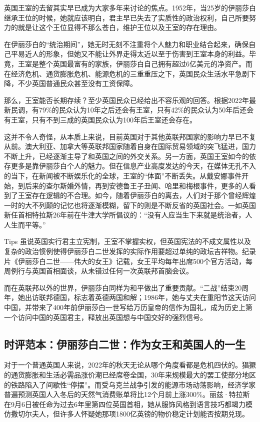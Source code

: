 英国王室的去留其实早已成为大家多年来讨论的焦点。1952年，当25岁的伊丽莎白继承王位的时候，她就应该明白，君主早已失去了实质性的政治权利，自己所要努力的就是让这个王位显得不那么苍白，维护王位以及王室的存在理由。

在伊丽莎白的“统治期间”，她无时无刻不注重将个人魅力和职业结合起来，确保自己平易近人的形象，但她又不能让外界走得太近以至于伤害到王室本身的利益。毕竟，王室是整个英国最富有的家族，伊丽莎白自己拥有超过6亿美元的净资产。而在经济危机、通货膨胀危机、能源危机的三重重压之下，英国民众生活水平急剧下降，不少英国普通民众甚至没有工资保障。

那么，王室能否长期存续？至少英国民众已经给出不容乐观的回答。根据2022年最新民调，有79\%的民众认为10年之后还会有王室，只有42\%的民众认为50年后还会有王室，只有不到三成的英国民众认为100年后王室还会存在。

这并不令人奇怪，从本质上来说，目前英国对于其他英联邦国家的影响力早已不复从前。澳大利亚、加拿大等英联邦国家随着自身在国际贸易领域的突飞猛进，国力不断上升，已经逐渐主导了和英国之间的外交关系。另一方面，英国王室如今的依存更多是靠伊丽莎白个人的魅力。但在信息产业高度发达的今天，在媒体无孔不入的当下，在新闻被不断娱乐化的全球，王室的“体面”不断丢失。从戴安娜事件开始，到后来的查尔斯婚外情，再到安德鲁王子丑闻、哈里和梅根事件，更多的人看到了王室存在逻辑的不合理。如今，随着伊丽莎白的离去，人们对于那个曾经辉煌一时的大不列颠的记忆也将逐渐模糊，留下的则是不断反省的英国社会。一如英国新任首相特拉斯26年前在牛津大学所倡议的：“没有人应当生下来就是统治者，人人生而平等。”

\begin{quoteBox}{Tips}
虽说英国实行君主立宪制，王室不掌握实权，但英国宪法的不成文属性以及复杂的政治惯例使得伊丽莎白二世发挥的实际作用要超过单纯的政坛吉祥物。纪录片《伊丽莎白二世——伟大的女王》记载，女王平均每年出席500个官方活动，每周例行与英国首相面谈，从未错过任何一次英联邦首脑会议。

而在英联邦以外的世界，伊丽莎白同样为和平做出了重要贡献。“二战”结束20周年，她出访联邦德国，标志着英德两国和解；1986年，她与丈夫在重阳节这天访问中国，并带来了400年前伊丽莎白一世写给万历皇帝的信作为国礼，成为历史上第一个访问中国的英国君主，释放出英国想与中国交好的强烈信号。
\end{quoteBox}

\subsection*{时评范本：伊丽莎白二世：作为女王和英国人的一生}

对于一个普通英国人来说，2022年的秋天无论从哪个角度看都是危机四伏的。猖獗的通货膨胀和生活必需品涨价潮已经席卷全国，30年来规模最大的罢工使部分地区的铁路陷入了间歇性“停摆”。而受乌克兰战争引发的能源市场动荡影响，经济学家普遍预测英国人入冬后的天然气消费账单将比12个月前上涨300\%。丽兹·特拉斯在9月6日被任命为过去6年里第四位英国首相，她从服饰风格到语言技巧都竭力模仿撒切尔夫人，但许多人怀疑她那项1800亿英镑的物价稳定计划能否按期兑现。

